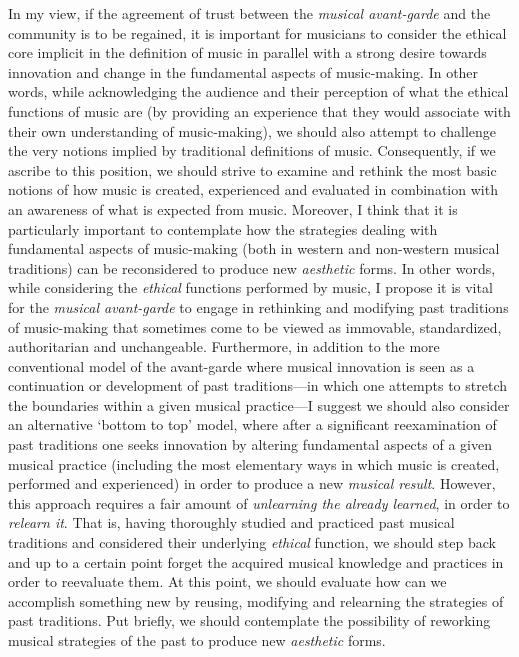 In my view, if the agreement of trust between the \emph{musical avant-garde} and the community is to be regained, it is important for musicians to consider the ethical core implicit in the definition of music in parallel with a strong desire towards innovation and change in the fundamental aspects of music-making. In other words, while acknowledging the audience and their perception of what the ethical functions of music are (by providing an experience that they would associate with their own understanding of music-making), we should also attempt to challenge the very notions implied by traditional definitions of music. Consequently, if we ascribe to this position, we should strive to examine and rethink the most basic notions of how music is created, experienced and evaluated in combination with an awareness of what is expected from music. Moreover, I think that it is particularly important to contemplate how the strategies dealing with fundamental aspects of music-making (both in western and non-western musical traditions) can be reconsidered to produce new \emph{aesthetic} forms. In other words, while considering the \emph{ethical} functions performed by music, I propose it is vital for the \emph{musical avant-garde} to engage in rethinking and modifying past traditions of music-making that sometimes come to be viewed as immovable, standardized, authoritarian and unchangeable. Furthermore, in addition to the more conventional model of the avant-garde where musical innovation is seen as a continuation or development of past traditions---in which one attempts to stretch the boundaries within a given musical practice---I suggest we should also consider an alternative `bottom to top' model, where after a significant reexamination of past traditions one seeks innovation by altering fundamental aspects of a given musical practice (including the most elementary ways in which music is created, performed and experienced) in order to produce a new \emph{musical result}. However, this approach requires a fair amount of \emph{unlearning the already learned}, in order to \emph{relearn it}. That is, having thoroughly studied and practiced past musical traditions and considered their underlying \emph{ethical} function, we should step back and up to a certain point forget the acquired musical knowledge and practices in order to reevaluate them. At this point, we should evaluate how can we accomplish something new by reusing, modifying and relearning the strategies of past traditions. Put briefly, we should contemplate the possibility of reworking musical strategies of the past to produce new \emph{aesthetic} forms. 

